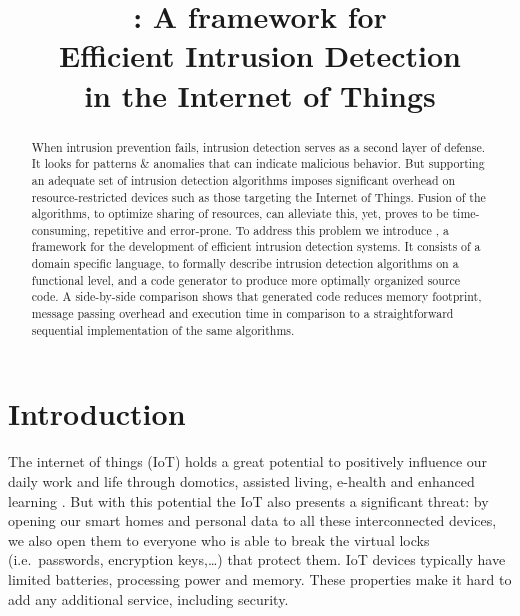 \documentclass[conference]{IEEEtran}
\begin{document}
\title{
\NAME: A framework for \\
Efficient Intrusion Detection\\
in the Internet of Things
}

\author{%
}

\maketitle

\begin{abstract}

When intrusion prevention fails, intrusion detection serves as a second layer
of defense. It looks for patterns \& anomalies that can indicate malicious
behavior. But supporting an adequate set of intrusion detection algorithms
imposes significant overhead on resource-restricted devices such as those
targeting the Internet of Things. Fusion of the algorithms, to optimize sharing
of resources, can alleviate this, yet, proves to be time-consuming, repetitive
and error-prone. To address this problem we introduce \NAME, a framework for
the development of efficient intrusion detection systems. It consists of a
domain specific language, to formally describe intrusion detection algorithms
on a functional level, and a code generator to produce more optimally organized
source code. A side-by-side comparison shows that generated code reduces memory
footprint, message passing overhead and execution time in comparison to a
straightforward sequential implementation of the same algorithms.

\end{abstract}

\section{Introduction}



The internet of things (IoT) holds a great potential to positively influence
our daily work and life through domotics, assisted living, e-health and
enhanced learning \cite{atzori2010internet}. But with this potential the IoT
also presents a significant threat: by opening our smart homes and personal
data to all these interconnected devices, we also open them to everyone who is
able to break the virtual locks (i.e.\ passwords, encryption keys,\dots) that
protect them. IoT devices typically have limited batteries, processing power
and memory. These properties make it hard to add any additional service,
including security.
\end{document}
